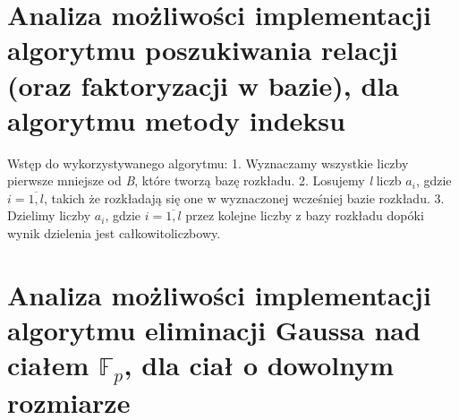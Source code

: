 \documentclass[]{article}
\begin{document}
\section{Analiza możliwości implementacji algorytmu poszukiwania relacji (oraz faktoryzacji w bazie), dla algorytmu metody indeksu}

Wstęp do wykorzystywanego algorytmu:
1. Wyznaczamy wszystkie liczby pierwsze mniejsze od \textit{B}, które tworzą bazę rozkładu.
2. Losujemy \textit{l} liczb $a_i$, gdzie $i=\overline{1,l}$, takich że rozkładają się one w wyznaczonej wcześniej bazie rozkładu.
3. Dzielimy liczby $a_i$, gdzie $i=\overline{1,l}$ przez kolejne liczby z bazy rozkładu dopóki wynik dzielenia jest całkowitoliczbowy.\newline


\section{Analiza możliwości implementacji algorytmu eliminacji Gaussa nad ciałem $\mathbb{F}_p$, dla ciał o dowolnym rozmiarze}~
\end{document}
